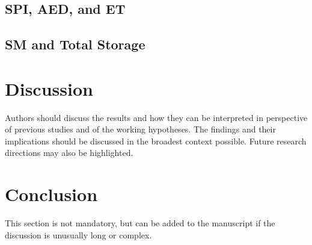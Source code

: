 \documentclass[preprint,
3p]{elsarticle} %
\begin{document}
\hypertarget{spi-aed-and-et}{%
\subsection{SPI, AED, and ET}\label{spi-aed-and-et}}

\hypertarget{sm-and-total-storage}{%
\subsection{SM and Total Storage}\label{sm-and-total-storage}}

\hypertarget{discussion}{%
\section{Discussion}\label{discussion}}

Authors should discuss the results and how they can be interpreted in
perspective of previous studies and of the working hypotheses. The
findings and their implications should be discussed in the broadest
context possible. Future research directions may also be highlighted.

\hypertarget{conclusion}{%
\section{Conclusion}\label{conclusion}}

This section is not mandatory, but can be added to the manuscript if the
discussion is unusually long or complex.

\renewcommand\refname{References}

\end{document}
